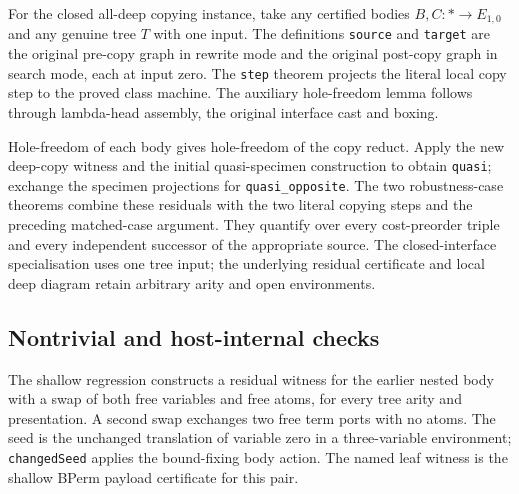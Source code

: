 For the closed all-deep copying instance, take any certified bodies
$B,C:*\to E_{1,0}$ and any genuine tree $T$ with one input. The definitions
\texttt{source} and \texttt{target} are the original pre-copy graph in rewrite
mode and the original post-copy graph in search mode, each at input zero.
The \texttt{step} theorem projects the literal local copy step to the proved
class machine. The auxiliary hole-freedom lemma follows through lambda-head
assembly, the original interface cast and boxing.


Hole-freedom of each body gives hole-freedom of the copy reduct. Apply the
new deep-copy witness and the initial quasi-specimen construction to obtain
\texttt{quasi}; exchange the specimen projections for
\texttt{quasi\_opposite}. The two robustness-case theorems combine these
residuals with the two literal copying steps and the preceding matched-case
argument. They quantify over every cost-preorder triple and every independent
successor of the appropriate source. The closed-interface specialisation uses
one tree input; the underlying residual certificate and local deep diagram
retain arbitrary arity and open environments.


\subsection{Nontrivial and host-internal checks}
The shallow regression constructs a residual witness for the earlier nested
body with a swap of both free variables and free atoms, for every tree arity
and presentation. A second swap exchanges two free term ports with no atoms.
The seed is the unchanged translation of variable zero in a three-variable
environment; \texttt{changedSeed} applies the bound-fixing body action.
The named leaf witness is the shallow BPerm payload certificate for this pair.

